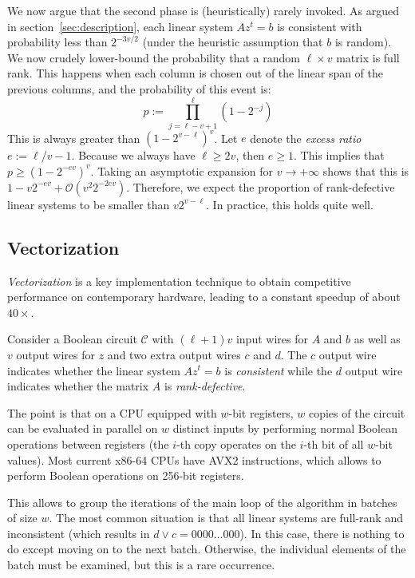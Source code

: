 \documentclass[a4paper,UKenglish,cleveref, autoref]{lipics-v2019}
\newcommand{\bigO}[1]{\ensuremath{\mathcal{O}\left( #1 \right)} }
\begin{document}
  We now argue that the second phase is (heuristically) rarely invoked.  As argued
  in section~\ref{sec:description}, each linear system $Az^t = b$ is consistent
  with probability less than $2^{-3v/2}$ (under the heuristic assumption that $b$
  is random). We now crudely lower-bound the probability that a random
  $\ell \times v$ matrix is full rank. This happens when each column is chosen out
  of the linear span of the previous columns, and the probability of this event
  is:
  \[
  p := \prod_{j=\ell-v+1}^\ell \left(1 - 2^{-j} \right)
  \]
  This is always greater than $\left(1 - 2^{v-\ell} \right)^v$. Let $e$ denote the
  \emph{excess ratio} $e := \ell/v - 1$. Because we always have $\ell \geq 2v$,
  then $e \geq 1$. This implies that $p \geq \left(1 - 2^{-ev} \right)^v$. Taking
  an asymptotic expansion for $v \rightarrow +\infty$ shows that this is
  $1 - v 2^{-ev} + \bigO{v^2 2^{-2ev}}$. Therefore, we expect the proportion of
  rank-defective linear systems to be smaller than $v 2^{v-\ell}$. In practice,
  this holds quite well.
  
  \subsection{Vectorization}
  
  \emph{Vectorization} is a key implementation technique to obtain competitive
  performance on contemporary hardware, leading to a constant speedup of about
  $40 \times$.
  
  Consider a Boolean circuit $\mathcal{C}$ with $(\ell+1)v$ input wires for $A$
  and $b$ as well as $v$ output wires for $z$ and two extra output wires $c$ and
  $d$. The $c$ output wire indicates whether the linear system $A z^t = b$ is
  \emph{consistent} while the $d$ output wire indicates whether the matrix $A$ is
  \emph{rank-defective}.
  
  The point is that on a CPU equipped with $w$-bit registers, $w$ copies of the
  circuit can be evaluated in parallel on $w$ distinct inputs by performing normal
  Boolean operations between registers (the $i$-th copy operates on the $i$-th bit
  of all $w$-bit values). Most current \textsf{x86-64} CPUs have \textsf{AVX2}
  instructions, which allows to perform Boolean operations on 256-bit registers.
  
  This allows to group the iterations of the main loop of the algorithm in batches
  of size $w$. The most common situation is that all linear systems are full-rank
  and inconsistent (which results in $d \vee c = 0000 \dots 000$). In this case,
  there is nothing to do except moving on to the next batch. Otherwise, the
  individual elements of the batch must be examined, but this is a rare occurrence.
  
\end{document}

